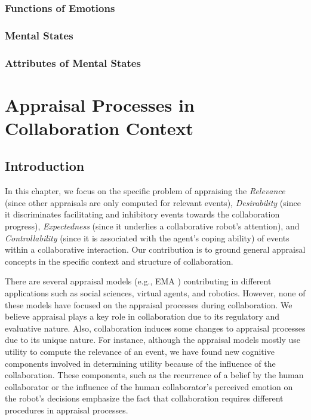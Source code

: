 \documentclass[12pt]{report}
\begin{document}
\subsection{Functions of Emotions}

\subsection{Mental States}
\label{sec:mental-states}

\subsection{Attributes of Mental States}

\chapter{Appraisal Processes in Collaboration Context}
\label{ch:appraisals}

\vspace*{-2mm}
\section{Introduction}
\vspace*{-3mm}
In this chapter, we focus on the specific problem of appraising the
\textit{Relevance} (since other appraisals are only computed for relevant
events), \textit{Desirability} (since it discriminates facilitating and
inhibitory events towards the collaboration progress), \textit{Expectedness}
(since it underlies a collaborative robot's attention), and
\textit{Controllability} (since it is associated with the agent's coping
ability) of events within a collaborative interaction. Our contribution is to
ground general appraisal concepts in the specific context and structure of
collaboration.

There are several appraisal models (e.g., EMA \cite{marsella:ema-process-model})
contributing in different applications such as social sciences, virtual agents,
and robotics. However, none of these models have focused on the appraisal
processes during collaboration. We believe appraisal plays a key role in
collaboration due to its regulatory and evaluative nature. Also, collaboration
induces some changes to appraisal processes due to its unique nature. For
instance, although the appraisal models mostly use utility to compute the
relevance of an event, we have found new cognitive components involved in
determining utility because of the influence of the collaboration. These
components, such as the recurrence of a belief by the human collaborator or the
influence of the human collaborator's perceived emotion on the robot's decisions
emphasize the fact that collaboration requires different procedures in appraisal
processes.
\end{document}
